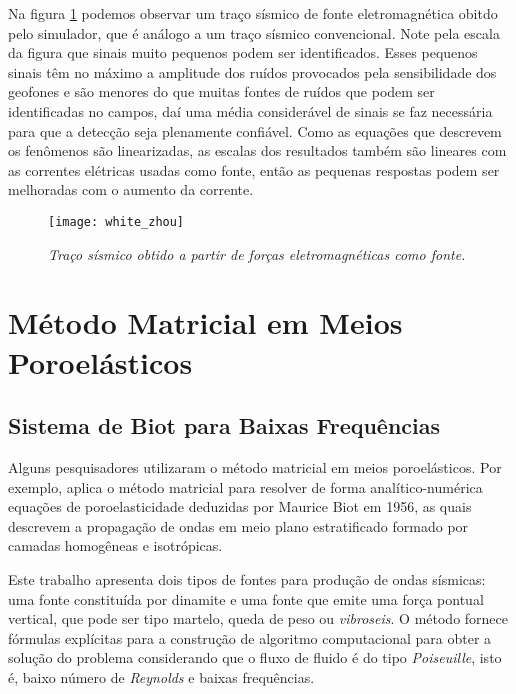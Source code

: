Na figura \ref{fig.white_zhou} podemos observar um tra\c{c}o s\'ismico de fonte eletromagn\'etica obitdo pelo simulador, que \'e an\'alogo a um tra\c{c}o s\'ismico convencional. Note pela escala da figura que sinais muito pequenos podem ser identificados. Esses pequenos sinais t\^em no m\'aximo a amplitude dos ru\'idos provocados pela sensibilidade dos geofones e s\~ao menores do que muitas fontes de ru\'idos que podem ser identificadas no campos, da\'i uma m\'edia consider\'avel de sinais se faz necess\'aria para que a detec\c{c}\~ao seja plenamente confi\'avel. Como as equa\c{c}\~oes que descrevem os fen\^omenos s\~ao linearizadas, as escalas dos resultados tamb\'em s\~ao lineares com as correntes el\'etricas usadas como fonte, ent\~ao as pequenas respostas podem ser melhoradas com o aumento da corrente.
\begin{figure}
\centering
\texttt{[image: white\_zhou]}
\caption{\textit{Tra\c{c}o s\'ismico obtido a partir de for\c{c}as eletromagn\'eticas como fonte.}}
\label{fig.white_zhou}
\end{figure}  

\section{M\'etodo Matricial em Meios Poroel\'asticos}\label{sec.matricial_poroelast}


\subsection{Sistema de Biot para Baixas Frequ\^encias}\label{sec.biot}

Alguns pesquisadores utilizaram o m\'etodo matricial em meios poroel\'asticos. Por exemplo,
\cite{Azeredo_2013} aplica o m\'etodo matricial para resolver de forma anal\'itico-num\'erica equa\c{c}\~oes de poroelasticidade deduzidas por Maurice Biot em 1956, as quais descrevem a propaga\c{c}\~ao de ondas em meio plano estratificado formado por camadas homog\^eneas e isotr\'opicas. 


Este trabalho apresenta dois tipos de fontes para produ\c{c}\~ao de ondas s\'ismicas:  uma fonte constitu\'ida por dinamite e uma fonte que emite uma for\c{c}a pontual vertical, que pode ser tipo martelo, queda de peso ou \textit{vibroseis}. O m\'etodo fornece f\'ormulas expl\'icitas para a constru\c{c}\~ao de algoritmo computacional  para obter a solu\c{c}\~ao do problema considerando que o fluxo de fluido \'e do tipo \textit{Poiseuille}, isto \'e, baixo n\'umero de \textit{Reynolds} e baixas frequ\^encias.

